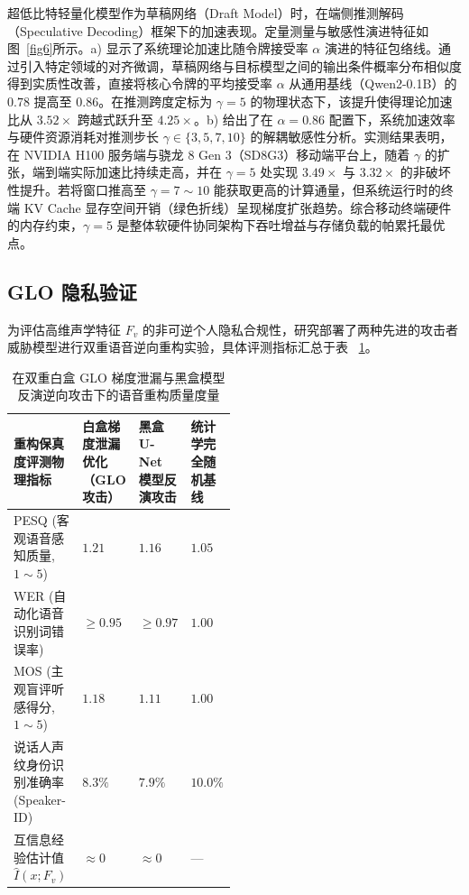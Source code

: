 \documentclass[11pt, a4paper]{article}
\begin{document}
超低比特轻量化模型作为草稿网络（Draft Model）时，在端侧推测解码（Speculative Decoding）框架下的加速表现。定量测量与敏感性演进特征如图~\ref{fig6}所示。a) 显示了系统理论加速比随令牌接受率 $\alpha$ 演进的特征包络线。通过引入特定领域的对齐微调，草稿网络与目标模型之间的输出条件概率分布相似度得到实质性改善，直接将核心令牌的平均接受率 $\alpha$ 从通用基线（Qwen2-0.1B）的 $0.78$ 提高至 $0.86$。在推测跨度定标为 $\gamma = 5$ 的物理状态下，该提升使得理论加速比从 $3.52\times$ 跨越式跃升至 $4.25\times$。b) 给出了在 $\alpha = 0.86$ 配置下，系统加速效率与硬件资源消耗对推测步长 $\gamma \in \{3, 5, 7, 10\}$ 的解耦敏感性分析。实测结果表明，在 NVIDIA H100 服务端与骁龙 8 Gen 3（SD8G3）移动端平台上，随着 $\gamma$ 的扩张，端到端实际加速比持续走高，并在 $\gamma = 5$ 处实现 $3.49\times$ 与 $3.32\times$ 的非破坏性提升。若将窗口推高至 $\gamma = 7 \sim 10$ 能获取更高的计算通量，但系统运行时的终端 KV Cache 显存空间开销（绿色折线）呈现梯度扩张趋势。综合移动终端硬件的内存约束，$\gamma = 5$ 是整体软硬件协同架构下吞吐增益与存储负载的帕累托最优点。


\subsection{ GLO 隐私验证}

为评估高维声学特征 $F_v$ 的非可逆个人隐私合规性，研究部署了两种先进的攻击者威胁模型进行双重语音逆向重构实验，具体评测指标汇总于表
~\ref{tab:privacy_attack}。

\begin{table}[htbp]
\centering
\caption{在双重白盒 GLO 梯度泄漏与黑盒模型反演逆向攻击下的语音重构质量度量}
\label{tab:privacy_attack}
\small
\renewcommand{\arraystretch}{1.25}
\begin{tabular}{l>{\centering\arraybackslash}p{0.17\linewidth}>{\centering\arraybackslash}p{0.16\linewidth}>{\centering\arraybackslash}p{0.16\linewidth}}
\toprule
\textbf{重构保真度评测物理指标} & \textbf{白盒梯度泄漏优化（GLO 攻击）} & \textbf{黑盒 U-Net 模型反演攻击} & \textbf{统计学完全随机基线} \\
\midrule
PESQ (客观语音感知质量, $1 \sim 5$) & $1.21$ & $1.16$ & $1.05$ \\
WER (自动化语音识别词错误率) & $\ge 0.95$ & $\ge 0.97$ & $1.00$ \\
MOS (主观盲评听感得分, $1 \sim 5$)& $1.18$ & $1.11$ & $1.00$ \\
说话人声纹身份识别准确率 (Speaker-ID) & $8.3\%$ & $7.9\%$ & $10.0\%$ \\
互信息经验估计值 $\hat{I}(x; F_v)$ & $\approx 0$ & $\approx 0$ & — \\
\bottomrule
\end{tabular}
\end{table}
\end{document}
